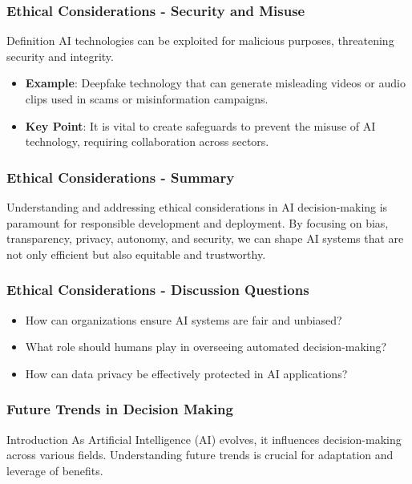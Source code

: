 \documentclass[aspectratio=169]{beamer}
\begin{document}
\begin{frame}[fragile]
    \frametitle{Ethical Considerations - Security and Misuse}
    \begin{block}{Definition}
        AI technologies can be exploited for malicious purposes, threatening security and integrity.
    \end{block}
    \begin{itemize}
        \item \textbf{Example}: Deepfake technology that can generate misleading videos or audio clips used in scams or misinformation campaigns.
        \item \textbf{Key Point}: It is vital to create safeguards to prevent the misuse of AI technology, requiring collaboration across sectors.
    \end{itemize}
\end{frame}

\begin{frame}[fragile]
    \frametitle{Ethical Considerations - Summary}
    Understanding and addressing ethical considerations in AI decision-making is paramount for responsible development and deployment. By focusing on bias, transparency, privacy, autonomy, and security, we can shape AI systems that are not only efficient but also equitable and trustworthy.
\end{frame}

\begin{frame}[fragile]
    \frametitle{Ethical Considerations - Discussion Questions}
    \begin{itemize}
        \item How can organizations ensure AI systems are fair and unbiased?
        \item What role should humans play in overseeing automated decision-making?
        \item How can data privacy be effectively protected in AI applications?
    \end{itemize}
\end{frame}

\begin{frame}[fragile]
    \frametitle{Future Trends in Decision Making}
    \begin{block}{Introduction}
        As Artificial Intelligence (AI) evolves, it influences decision-making across various fields. Understanding future trends is crucial for adaptation and leverage of benefits.
    \end{block}
\end{frame}
\end{document}
